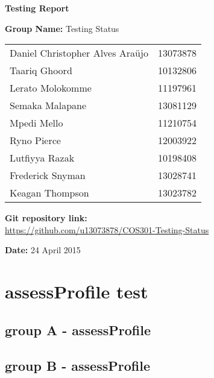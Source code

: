 \documentclass[a4paper,11pt]{article}
\begin{document}
\begin{center}

\Huge\textbf{Testing Report\\}
																											
\vspace{2 cm}

\LARGE\textbf{Group Name:} Testing Status\newline
 
\vspace{0.5 cm}
\begin{tabular}{lr}
Daniel Christopher Alves Ara\"{u}jo&13073878\\ 
Taariq Ghoord&10132806\\
Lerato Molokomme&11197961\\
Semaka Malapane&13081129\\
Mpedi Mello&11210754\\
Ryno Pierce&12003922\\
Lutfiyya Razak&10198408\\
Frederick Snyman&13028741\\
Keagan Thompson&13023782\\
\end{tabular}

\vspace{1cm}
\textbf{Git repository link:\\}
\url{https://github.com/u13073878/COS301-Testing-Status}

\vspace{1cm}
\textbf{Date:} 24 April 2015
\end{center}
\newpage

\tableofcontents
{}
\newpage


\section{assessProfile test}
\subsection{group A - assessProfile}


\subsection{group B - assessProfile}
\end{document}
